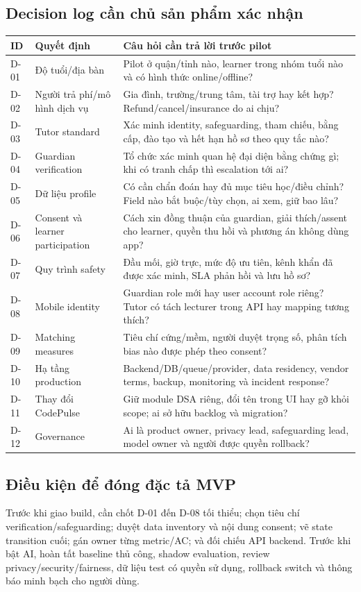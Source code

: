 \documentclass[11pt,a4paper]{article}
\begin{document}
\subsection{Decision log cần chủ sản phẩm xác nhận}
\begin{longtable}{p{1.4cm}p{5.2cm}p{8.2cm}}
\toprule
\textbf{ID} & \textbf{Quyết định} & \textbf{Câu hỏi cần trả lời trước pilot} \\
\midrule
\endhead
D-01 & Độ tuổi/địa bàn & Pilot ở quận/tỉnh nào, learner trong nhóm tuổi nào và có hình thức online/offline? \\
D-02 & Người trả phí/mô hình dịch vụ & Gia đình, trường/trung tâm, tài trợ hay kết hợp? Refund/cancel/insurance do ai chịu? \\
D-03 & Tutor standard & Xác minh identity, safeguarding, tham chiếu, bằng cấp, đào tạo và hết hạn hồ sơ theo quy tắc nào? \\
D-04 & Guardian verification & Tổ chức xác minh quan hệ đại diện bằng chứng gì; khi có tranh chấp thì escalation tới ai? \\
D-05 & Dữ liệu profile & Có cần chẩn đoán hay đủ mục tiêu học/điều chỉnh? Field nào bắt buộc/tùy chọn, ai xem, giữ bao lâu? \\
D-06 & Consent và learner participation & Cách xin đồng thuận của guardian, giải thích/assent cho learner, quyền thu hồi và phương án không dùng app? \\
D-07 & Quy trình safety & Đầu mối, giờ trực, mức độ ưu tiên, kênh khẩn đã được xác minh, SLA phản hồi và lưu hồ sơ? \\
D-08 & Mobile identity & Guardian role mới hay user account role riêng? Tutor có tách lecturer trong API hay mapping tương thích? \\
D-09 & Matching measures & Tiêu chí cứng/mềm, người duyệt trọng số, phân tích bias nào được phép theo consent? \\
D-10 & Hạ tầng production & Backend/DB/queue/provider, data residency, vendor terms, backup, monitoring và incident response? \\
D-11 & Thay đổi CodePulse & Giữ module DSA riêng, đổi tên trong UI hay gỡ khỏi scope; ai sở hữu backlog và migration? \\
D-12 & Governance & Ai là product owner, privacy lead, safeguarding lead, model owner và người được quyền rollback? \\
\bottomrule
\end{longtable}

\subsection{Điều kiện để đóng đặc tả MVP}
Trước khi giao build, cần chốt D-01 đến D-08 tối thiểu; chọn tiêu chí verification/safeguarding; duyệt data inventory và nội dung consent; vẽ state transition cuối; gán owner từng metric/AC; và đối chiếu API backend. Trước khi bật AI, hoàn tất baseline thủ công, shadow evaluation, review privacy/security/fairness, dữ liệu test có quyền sử dụng, rollback switch và thông báo minh bạch cho người dùng.
\end{document}
